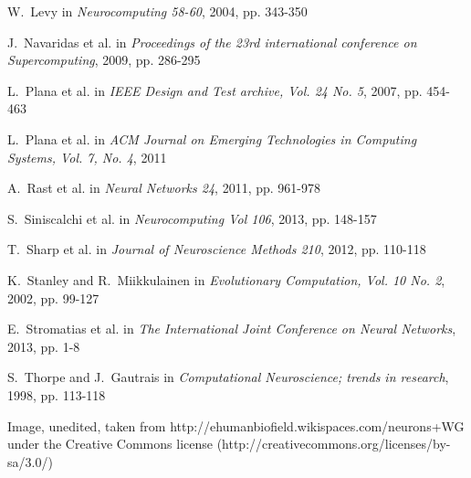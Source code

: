 \documentclass[journal]{./sty/IEEEtran}
\begin{document}
\begin{thebibliography}{23}
W.~Levy in \emph{Neurocomputing 58-60}, 2004, pp. 343-350

J.~Navaridas et al. in \emph{Proceedings of the 23rd international conference on Supercomputing}, 2009, pp. 286-295 

L.~Plana et al. in \emph{IEEE Design and Test archive, Vol. 24 No. 5}, 2007, pp. 454-463

L.~Plana et al. in \emph{ACM Journal on Emerging Technologies in Computing Systems, Vol. 7, No. 4}, 2011

A.~Rast et al. in \emph{Neural Networks 24}, 2011, pp. 961-978

S.~Siniscalchi et al. in \emph{Neurocomputing Vol 106}, 2013, pp. 148-157

T.~Sharp et al. in \emph{Journal of Neuroscience Methods 210}, 2012, pp. 110-118

K.~Stanley and R.~Miikkulainen in \emph{Evolutionary Computation, Vol. 10 No. 2}, 2002, pp. 99-127

E.~Stromatias et al. in \emph{The International Joint Conference on Neural Networks}, 2013, pp. 1-8

S.~Thorpe and J.~Gautrais in \emph{Computational Neuroscience; trends in research}, 1998, pp. 113-118

Image, unedited, taken from http://ehumanbiofield.wikispaces.com/neurons+WG under the Creative Commons license (http://creativecommons.org/licenses/by-sa/3.0/)

\end{thebibliography}
\end{document}
